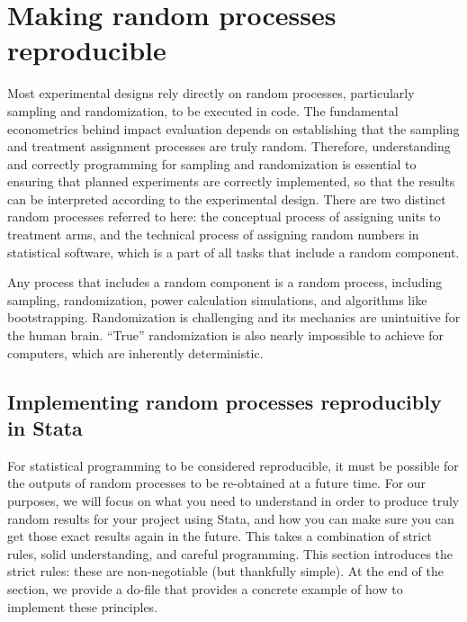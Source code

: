 
\section{Making random processes reproducible}

Most experimental designs rely directly on random processes,
particularly sampling and randomization, to be executed in code.
The fundamental econometrics behind impact evaluation
depends on establishing that the sampling
and treatment assignment processes are truly random.
Therefore, understanding and correctly programming for sampling and randomization
is essential to ensuring that planned experiments
are correctly implemented, so that the results
can be interpreted according to the experimental design.
There are two distinct random processes referred to here:
the conceptual process of assigning units to treatment arms,
and the technical process of assigning random numbers in statistical software,
which is a part of all tasks that include a random component.

Any process that includes a random component is a random process,
including sampling, randomization, power calculation simulations, and algorithms like bootstrapping.
Randomization is challenging and its mechanics are unintuitive for the human brain.
``True'' randomization is also nearly impossible to achieve for computers,
which are inherently deterministic.

\subsection{Implementing random processes reproducibly in Stata}

For statistical programming to be considered reproducible, it must be possible for the outputs of random processes
to be re-obtained at a future time.\cite{orozco2018make}
For our purposes, we will focus on what you need to understand
in order to produce truly random results for your project using Stata,
and how you can make sure you can get those exact results again in the future.
This takes a combination of strict rules, solid understanding, and careful programming.
This section introduces the strict rules: these are non-negotiable (but thankfully simple). 
At the end of the section, 
we provide a do-file that provides a concrete example of how to implement these principles. 

